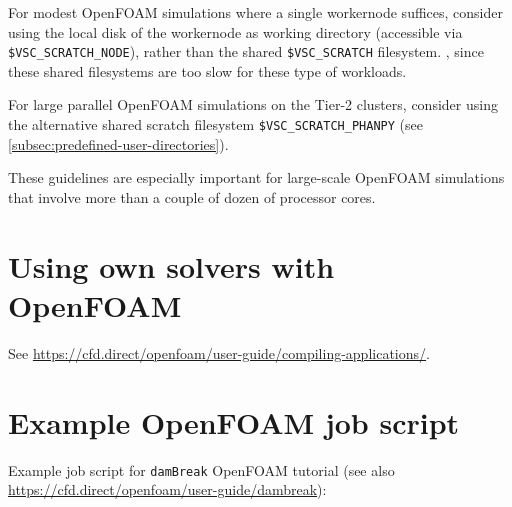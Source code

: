 For modest OpenFOAM simulations where a single workernode suffices, consider using the local disk of the
workernode as working directory (accessible via \lstinline|$VSC_SCRATCH_NODE|),
rather than the shared \lstinline|$VSC_SCRATCH| filesystem. , since these shared filesystems are too slow for these type of workloads.

\ifgent
For large parallel OpenFOAM simulations on the \university Tier-2 clusters, consider using the
alternative shared scratch filesystem \lstinline|$VSC_SCRATCH_PHANPY| (see \autoref{subsec:predefined-user-directories}).
\fi

These guidelines are especially important for large-scale OpenFOAM simulations that involve
more than a couple of dozen of processor cores.


\section{Using own solvers with OpenFOAM}
\label{sec:best-practices-openfoam-own-solvers-libraries}

See \url{https://cfd.direct/openfoam/user-guide/compiling-applications/}.

\section{Example OpenFOAM job script}
\label{sec:best-practices-openfoam-example-script}

Example job script for \lstinline|damBreak| OpenFOAM tutorial
(see also \url{https://cfd.direct/openfoam/user-guide/dambreak}):

